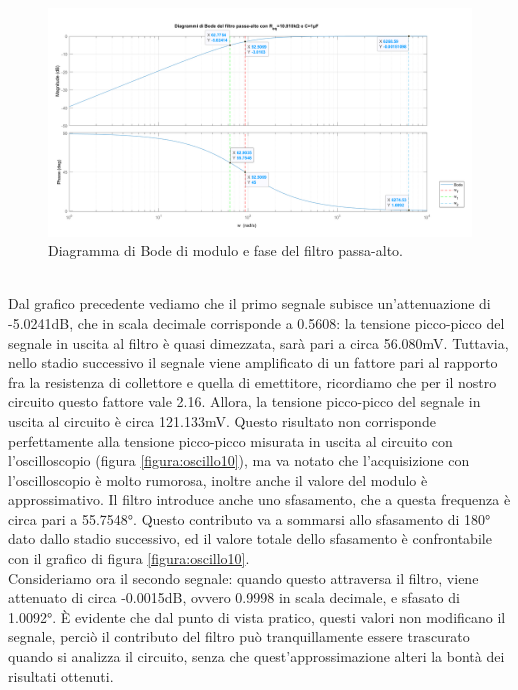 \documentclass{report}
\begin{document}
\begin{figure}[h]
\centering
\includegraphics[width=\textwidth]{immagini/graficoCEv3}
\caption{Diagramma di Bode di modulo e fase del filtro passa-alto.}
\label{figura:grafico2}
\end{figure}
\\Dal grafico precedente vediamo che il primo segnale subisce un'attenuazione di -5.0241dB, che in scala decimale corrisponde a 0.5608: la tensione picco-picco del segnale in uscita al filtro è quasi dimezzata, sarà pari a circa 56.080mV. Tuttavia, nello stadio successivo il segnale viene amplificato di un fattore pari al rapporto fra la resistenza di collettore e quella di emettitore, ricordiamo che per il nostro circuito questo fattore vale 2.16. Allora, la tensione picco-picco del segnale in uscita al circuito è circa 121.133mV. Questo risultato non corrisponde perfettamente alla tensione picco-picco misurata in uscita al circuito con l'oscilloscopio (figura \ref{figura:oscillo10}), ma va notato che l'acquisizione con l'oscilloscopio è molto rumorosa, inoltre anche il valore del modulo è approssimativo. Il filtro introduce anche uno sfasamento, che a questa frequenza è circa pari a 55.7548°. Questo contributo va a sommarsi allo sfasamento di 180° dato dallo stadio successivo, ed il valore totale dello sfasamento è confrontabile con il grafico di figura \ref{figura:oscillo10}.
\\\indent Consideriamo ora il secondo segnale: quando questo attraversa il filtro, viene attenuato di circa -0.0015dB, ovvero 0.9998 in scala decimale, e sfasato di 1.0092°. È evidente che dal punto di vista pratico, questi valori non modificano il segnale, perciò il contributo del filtro può tranquillamente essere trascurato quando si analizza il circuito, senza che quest'approssimazione alteri la bontà dei risultati ottenuti.  
\clearpage
\newpage
\end{document}
